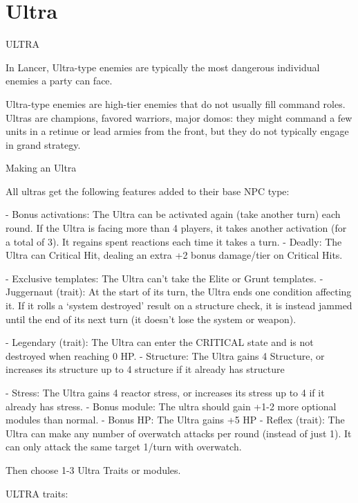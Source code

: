 \section{Ultra}
                                                   ULTRA  

In Lancer, Ultra-type enemies are typically the most dangerous individual enemies a party can  
face.   

Ultra-type enemies are high-tier enemies that do not usually fill command roles. Ultras are  
champions, favored warriors, major domos: they might command a few units in a retinue or lead  
armies from the front, but they do not typically engage in grand strategy.    

Making an Ultra
 
All ultras get the following features added to their base NPC type:
 
    -    Bonus activations: The Ultra can be activated again (take another turn) each round. If  
        the Ultra is facing more than 4 players, it takes another activation (for a total of 3). It  
         regains spent reactions each time it takes a turn.  
    -    Deadly: The Ultra can Critical Hit, dealing an extra +2 bonus damage/tier on Critical Hits.
 
    -    Exclusive templates: The Ultra can’t take the Elite or Grunt templates.  
    -   Juggernaut (trait): At the start of its turn, the Ultra ends one condition affecting it. If it  
         rolls a ‘system destroyed’ result on a structure check, it is instead jammed until the end of  
         its next turn (it doesn’t lose the system or weapon).
 
    -    Legendary (trait): The Ultra can enter the CRITICAL state and is not destroyed when  
         reaching 0 HP.  
    -   Structure: The Ultra gains 4 Structure, or increases its structure up to 4 structure if it  
         already has structure
 
    -   Stress: The Ultra gains 4 reactor stress, or increases its stress up to 4 if it already has  
        stress.  
    -    Bonus module: The ultra should gain +1-2 more optional modules than normal.  
    -    Bonus HP: The Ultra gains +5 HP  
    -    Reflex (trait): The Ultra can make any number of overwatch attacks per round (instead of  
        just 1). It can only attack the same target 1/turn with overwatch.  

Then choose 1-3 Ultra Traits or modules.
 

ULTRA traits:
 

